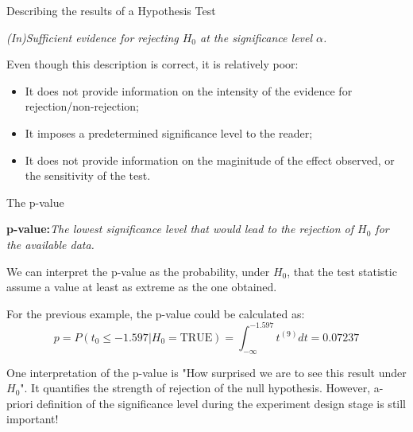 \begin{frame}{Describing the results of a Hypothesis Test}
  \begin{block}{}
    \begin{center}
      \emph{(In)Sufficient evidence for rejecting $H_0$ at the significance level $\alpha$.}
    \end{center}
  \end{block}
  \bigskip

  Even though this description is correct, it is relatively poor:
  \begin{itemize}
    \item It does not provide information on the intensity of the evidence for rejection/non-rejection;
    \item It imposes a predetermined significance level to the reader;
    \item It does not provide information on the maginitude of the effect observed, or the sensitivity of the test.
  \end{itemize}
\end{frame}

\begin{frame}{The p-value}
  \begin{block}{}
    \begin{center}
      {\bf p-value:}\emph{The lowest significance level that would lead to the rejection of $H_0$ for the available data.}
    \end{center}
  \end{block}

  We can interpret the p-value as the probability, under $H_0$, that the test statistic assume a value at least as extreme as the one obtained.\bigskip

  For the previous example, the p-value could be calculated as:
  \begin{equation*}
    p = P(t_0 \leq -1.597|H_0 = \text{TRUE}) = \int^{-1.597}_{-\infty}t^{(9)}dt = 0.07237
  \end{equation*}\bigskip

  One interpretation of the p-value is "How surprised we are to see this result under $H_0$". It quantifies the strength of rejection of the null hypothesis. \alert{However, a-priori definition of the significance level during the experiment design stage is still important!}
\end{frame}

